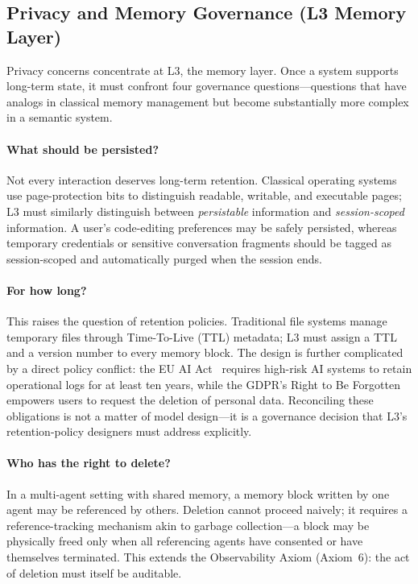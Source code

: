 \documentclass[11pt,a4paper]{article}
\begin{document}
\subsection{Privacy and Memory Governance (L3 Memory Layer)}
\label{sec:ethics-privacy}

Privacy concerns concentrate at L3, the memory layer. Once a system supports long-term state, it must confront four governance questions---questions that have analogs in classical memory management but become substantially more complex in a semantic system.

\paragraph{What should be persisted?}
Not every interaction deserves long-term retention. Classical operating systems use page-protection bits to distinguish readable, writable, and executable pages; L3 must similarly distinguish between \textit{persistable} information and \textit{session-scoped} information. A user's code-editing preferences may be safely persisted, whereas temporary credentials or sensitive conversation fragments should be tagged as session-scoped and automatically purged when the session ends.

\paragraph{For how long?}
This raises the question of retention policies. Traditional file systems manage temporary files through Time-To-Live (TTL) metadata; L3 must assign a TTL and a version number to every memory block. The design is further complicated by a direct policy conflict: the EU AI Act~\cite{euaiact2026} requires high-risk AI systems to retain operational logs for at least ten years, while the GDPR's Right to Be Forgotten~\cite{gdpr_righttoforget} empowers users to request the deletion of personal data. Reconciling these obligations is not a matter of model design---it is a governance decision that L3's retention-policy designers must address explicitly.

\paragraph{Who has the right to delete?}
In a multi-agent setting with shared memory, a memory block written by one agent may be referenced by others. Deletion cannot proceed naively; it requires a reference-tracking mechanism akin to garbage collection---a block may be physically freed only when all referencing agents have consented or have themselves terminated. This extends the Observability Axiom (Axiom~6): the act of deletion must itself be auditable.
\end{document}
